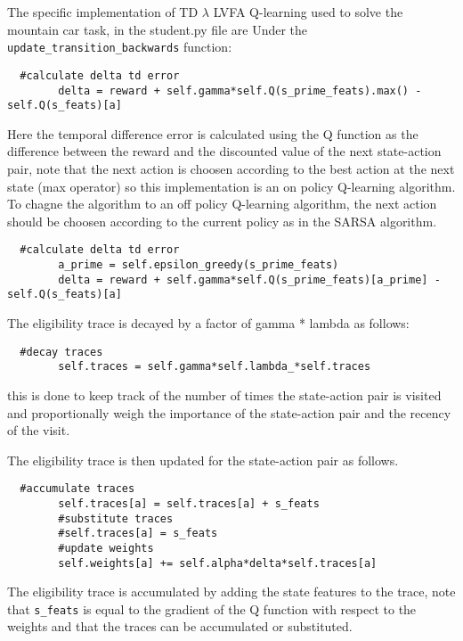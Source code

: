 \documentclass{article}
\begin{document}
The specific implementation of TD  $\lambda$ LVFA Q-learning used to solve the mountain car task, in the student.py file are
Under the \texttt{update\_transition\_backwards} function:

\begin{verbatim}
  #calculate delta td error
        delta = reward + self.gamma*self.Q(s_prime_feats).max() - self.Q(s_feats)[a]
\end{verbatim}

Here the temporal difference error is calculated using the Q function as the difference between
the reward and the discounted value of the next state-action pair,
note that the next action is choosen according to the best action at the next state (max operator)
so this implementation is an on policy Q-learning algorithm.
\\
To chagne the algorithm to an off policy Q-learning algorithm, the next action should be choosen
according to the current policy as in the SARSA algorithm.

\begin{verbatim}
  #calculate delta td error
        a_prime = self.epsilon_greedy(s_prime_feats)
        delta = reward + self.gamma*self.Q(s_prime_feats)[a_prime] - self.Q(s_feats)[a]
\end{verbatim}

The eligibility trace is decayed by a factor of gamma * lambda as follows:
\begin{verbatim}
  #decay traces
        self.traces = self.gamma*self.lambda_*self.traces
\end{verbatim}

this is done to keep track of the number of times the state-action pair is visited and proportionally
weigh the importance of the state-action pair and the recency of the visit.

The eligibility trace is then updated for the state-action pair as follows.
\begin{verbatim}
  #accumulate traces
        self.traces[a] = self.traces[a] + s_feats
        #substitute traces
        #self.traces[a] = s_feats  
        #update weights
        self.weights[a] += self.alpha*delta*self.traces[a]
\end{verbatim}

The eligibility trace is accumulated by adding the state features to the trace, note that
\texttt{s\_feats} is equal to the gradient of the Q function with respect to the weights and that 
the traces can be accumulated or substituted.
\end{document}
